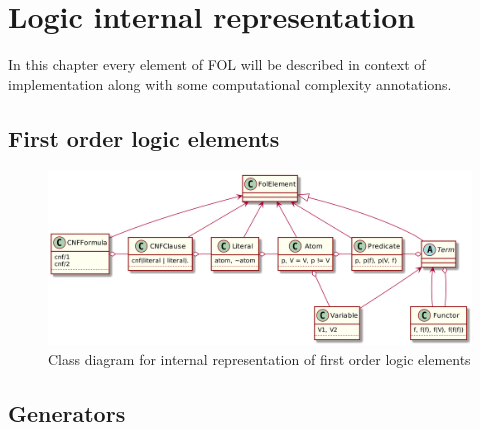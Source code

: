 \chapter{Logic internal representation}
\label{chap:LogicInternalRepresentation}

In this chapter every element of \gls{FOL} will be described in context of implementation along with some computational complexity annotations.

\section{First order logic elements}

\begin{figure}[H]
\begin{centering}
  \includegraphics[width=\textwidth]{logic-formula-generator/fol/cnf_fol_elements.png}
  \caption{Class diagram for internal representation of first order logic elements}
\end{centering}
\end{figure}

\section{Generators}


